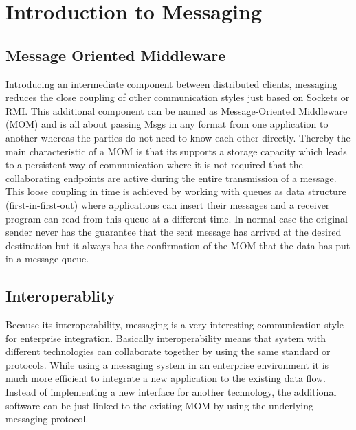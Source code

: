 \chapter{Introduction to Messaging} 

\section{Message Oriented Middleware}
\label{intro-messaging-mom}
Introducing an intermediate component between distributed
clients, messaging reduces the close coupling of other communication styles just
based on \gls{Socket}s or RMI. This additional component can be named as
Message-Oriented Middleware (MOM) and is all about passing \gls{Msg}s in any
format from one application to another whereas the parties do not need to know
each other directly. Thereby the main characteristic of a MOM is that its
supports a storage capacity which leads to a persistent way of communication where it is
not required that the collaborating endpoints are active during the entire
transmission of a message. This loose coupling in time is achieved by
working with queues as data structure (first-in-first-out) where applications
can insert their messages and a receiver program can read from this queue at a
different time. In normal case the original sender
never has the guarantee that the sent message has arrived at the desired
destination but it always has the confirmation of the MOM that the data has put
in a message queue. \cite{PprIBMIntro} \cite{TAN06}




\section{Interoperablity}
Because its interoperability, messaging is a very interesting communication
style for enterprise integration. Basically interoperability means that system with
different technologies can collaborate together by using the same standard or
protocols. While using a messaging system in an enterprise environment it is
much more efficient to integrate a new application to the existing data flow.
Instead of implementing a new interface for another technology, the additional
software can be just linked to the existing MOM by using the underlying
messaging protocol.\\


